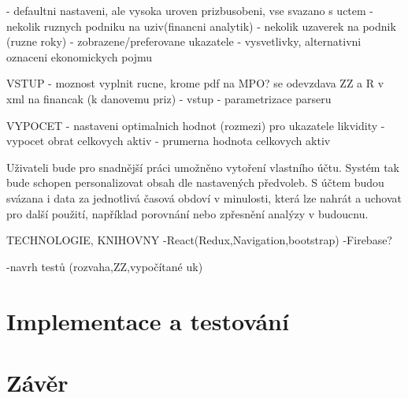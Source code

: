 - defaultni nastaveni, ale vysoka uroven prizbusobeni, vse svazano s uctem
- nekolik ruznych podniku na uziv(financni analytik)
- nekolik uzaverek na podnik (ruzne roky)
- zobrazene/preferovane ukazatele
- vysvetlivky, alternativni oznaceni ekonomickych pojmu
 
VSTUP
- moznost vyplnit rucne, krome pdf na MPO? se odevzdava ZZ a R v xml na financak (k danovemu priz)
- vstup - parametrizace parseru


VYPOCET
- nastaveni optimalnich hodnot (rozmezi) pro ukazatele likvidity
- vypocet obrat celkovych aktiv - prumerna hodnota celkovych aktiv

Uživateli bude pro snadnější práci umožněno vytoření vlastního účtu. Systém tak bude schopen personalizovat obsah dle nastavených předvoleb. S účtem budou svázana i data za jednotlivá časová obdoví v minulosti, která lze nahrát a uchovat pro další použití, například porovnání nebo zpřesnění analýzy v budoucnu.

TECHNOLOGIE, KNIHOVNY
-React(Redux,Navigation,bootstrap)
-Firebase?

-navrh testů (rozvaha,ZZ,vypočítané uk)

\chapter{Implementace a testování}
\chapter{Závěr}
